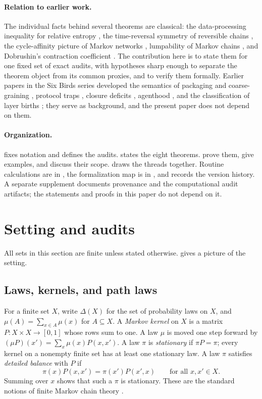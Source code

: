 \documentclass[11pt]{article}
\theoremstyle{definition}
\newcommand{\1}{\mathbf{1}}
\begin{document}
\paragraph{Relation to earlier work.}
The individual facts behind several theorems are classical: the data-processing inequality for relative entropy \citep{CoverThomas2006}, the time-reversal symmetry of reversible chains \citep{Kelly1979}, the cycle-affinity picture of Markov networks \citep{Schnakenberg1976}, lumpability of Markov chains \citep{KemenySnell1960,Buchholz1994}, and Dobrushin's contraction coefficient \citep{Dobrushin1956,Seneta2006}.
The contribution here is to state them for one fixed set of exact audits, with hypotheses sharp enough to separate the theorem object from its common proxies, and to verify them formally.
Earlier papers in the Six Birds series developed the semantics of packaging and coarse-graining \citep{SB_LAY}, protocol traps \citep{SB_PROTOCOL_TRAP}, closure deficits \citep{SB_CAST}, agenthood \citep{SB_THROW}, and the classification of layer births \citep{SB_CLASSIFY}; they serve as background, and the present paper does not depend on them.

\paragraph{Organization.}
 fixes notation and defines the audits.
 states the eight theorems.
 prove them, give examples, and discuss their scope.
 draws the threads together.
Routine calculations are in , the formalization map is in , and  records the version history.
A separate supplement documents provenance and the computational audit artifacts; the statements and proofs in this paper do not depend on it.
 \section{Setting and audits}\label{sec:setup}

All sets in this section are finite unless stated otherwise.
 gives a picture of the setting.

\subsection{Laws, kernels, and path laws}
For a finite set $X$, write $\Delta(X)$ for the set of probability laws on $X$, and $\mu(A)=\sum_{x\in A}\mu(x)$ for $A\subseteq X$.
A \emph{Markov kernel} on $X$ is a matrix $P:X\times X\to[0,1]$ whose rows sum to one.
A law $\mu$ is moved one step forward by $(\mu P)(x')=\sum_{x}\mu(x)P(x,x')$.
A law $\pi$ is \emph{stationary} if $\pi P=\pi$; every kernel on a nonempty finite set has at least one stationary law.
A law $\pi$ satisfies \emph{detailed balance} with $P$ if
\[
  \pi(x)P(x,x')=\pi(x')P(x',x)\qquad\text{for all }x,x'\in X.
\]
Summing over $x$ shows that such a $\pi$ is stationary.
These are the standard notions of finite Markov chain theory \citep{Norris1997,LevinPeresWilmer2017}.
\end{document}
